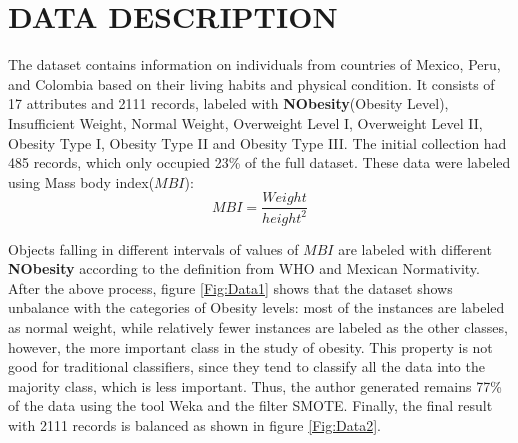 \section{DATA DESCRIPTION}
The dataset\cite{palechor2019dataset} contains information on individuals from countries of Mexico, Peru, and Colombia based on their living habits and physical condition. It consists of 17 attributes and 2111 records, labeled with
\textbf{NObesity}(Obesity Level), Insufficient Weight, Normal Weight, Overweight Level I, Overweight Level II, Obesity Type I, Obesity Type II and Obesity Type III. The initial collection had 485 records, which only occupied 23\% of the full dataset. These data were labeled using Mass body index($MBI$):
$$MBI = \frac{Weight}{height^2}$$

Objects falling in different intervals of values of $MBI$ are labeled with different \textbf{NObesity} according to the definition from WHO and Mexican Normativity\cite{lanorma}. \\
After the above process, figure \ref{Fig:Data1} shows that the dataset shows unbalance with the categories of Obesity levels: most of the instances are labeled as normal weight, while relatively fewer instances are labeled as the other classes, however, the more important class in the study of obesity. This property is not good for traditional classifiers, since they tend to classify all the data into the majority class, which is less important\cite{kotsiantis2006handling}. Thus, the author generated remains 77\% of the data using the tool Weka and the filter SMOTE\cite{chawla2002smote}. Finally, the final result with 2111 records is balanced as shown in figure \ref{Fig:Data2}.

